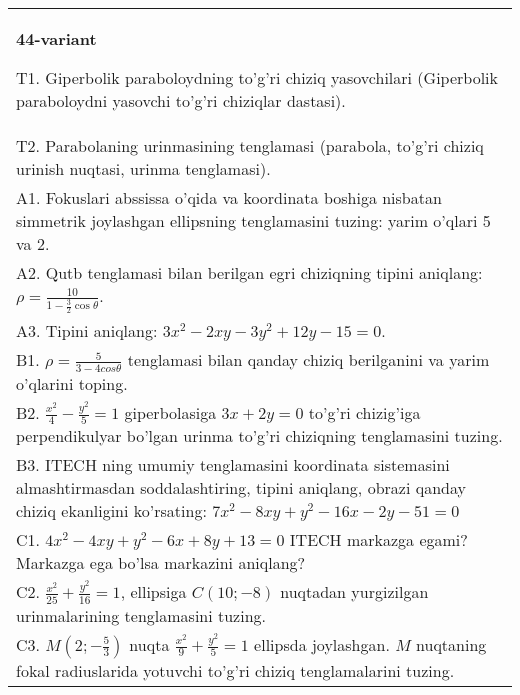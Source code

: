 \documentclass{article}
\begin{document}
\begin{tabular}{m{17cm}}
\textbf{44-variant}
\newline

T1. Giperbolik paraboloydning to'g'ri chiziq yasovchilari (Giperbolik paraboloydni yasovchi to'g'ri chiziqlar dastasi).\\

T2. Parabolaning urinmasining tenglamasi (parabola, to'g'ri chiziq urinish nuqtasi, urinma tenglamasi).\\

A1. Fokuslari abssissa o'qida va koordinata boshiga nisbatan simmetrik joylashgan ellipsning tenglamasini tuzing: yarim o'qlari 5 va 2.\\

A2. Qutb tenglamasi bilan berilgan egri chiziqning tipini aniqlang: $\rho=\frac{10}{1-\frac{3}{2}\cos\theta}$.\\

A3. Tipini aniqlang: $3x^{2}-2xy-3y^{2}+12y-15=0$.\\

B1. $\rho = \frac{5}{3 - 4cos\theta}$ tenglamasi bilan qanday chiziq berilganini va yarim o'qlarini toping.  \\

B2. $\frac{x^{2}}{4} - \frac{y^{2}}{5} = 1$ giperbolasiga $3x + 2y = 0$ to'g'ri chizig'iga perpendikulyar bo'lgan urinma to'g'ri chiziqning tenglamasini tuzing.\\

B3. ITECH ning umumiy tenglamasini koordinata sistemasini almashtirmasdan soddalashtiring, tipini aniqlang, obrazi qanday chiziq ekanligini ko'rsating: $7x^{2} - 8xy + y^{2} - 16x - 2y - 51 = 0$\\

C1. $4x^{2} - 4xy + y^{2} - 6x + 8y + 13 = 0$ ITECH markazga egami? Markazga ega bo'lsa markazini aniqlang?  \\

C2. $\frac{x^{2}}{25} + \frac{y^{2}}{16} = 1$, ellipsiga $C(10; - 8)$ nuqtadan yurgizilgan urinmalarining tenglamasini tuzing.  \\

C3. $M(2; - \frac{5}{3})$ nuqta $\frac{x^{2}}{9} + \frac{y^{2}}{5} = 1$ ellipsda joylashgan. $M$ nuqtaning fokal radiuslarida yotuvchi to'g'ri chiziq tenglamalarini tuzing.  \\

\end{tabular}
\vspace{1cm}
\end{document}
